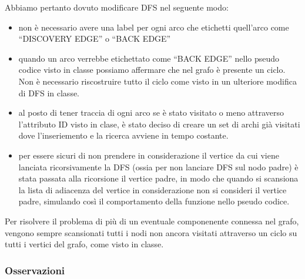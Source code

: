 \noindent Abbiamo pertanto dovuto modificare DFS nel seguente modo:
\begin{itemize}
	\item non è necessario avere una label per ogni arco che etichetti quell'arco come ``DISCOVERY EDGE'' o ``BACK EDGE''
	\item quando un arco verrebbe etichettato come ``BACK EDGE'' nello pseudo codice visto in classe possiamo affermare che nel grafo è presente un ciclo. Non è necessario riscostruire tutto il ciclo come visto in un ulteriore modifica di DFS in classe.
	\item al posto di tener traccia di ogni arco se è stato visitato o meno attraverso l'attributo ID visto in clase, è stato deciso di creare un set di archi già visitati dove l'inseriemento e la ricerca avviene in tempo costante.
	\item per essere sicuri di non prendere in considerazione il vertice da cui viene lanciata ricorsivamente la DFS (ossia per non lanciare DFS sul nodo padre) è stata passata alla ricorsione il vertice padre, in modo che quando si scansiona la lista di adiacenza del vertice in considerazione non si consideri il vertice padre, simulando così il comportamento della funzione  nello pseudo codice.
\end{itemize}

\noindent Per risolvere il problema di più di un eventuale componenente connessa nel grafo, vengono sempre scansionati tutti i nodi non ancora visitati attraverso un ciclo  su tutti i vertici del grafo, come visto in classe.

\subsubsection{Osservazioni}


